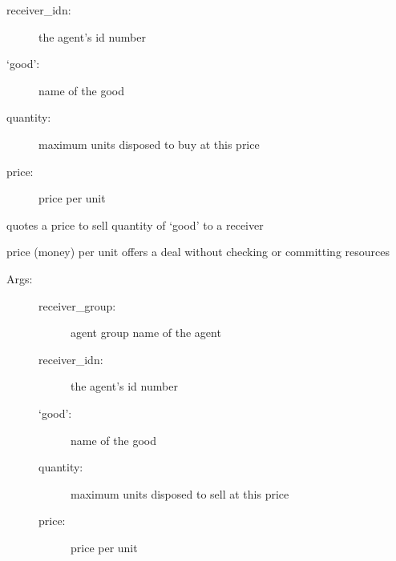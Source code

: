 \documentclass[letterpaper,10pt,english]{sphinxmanual}
\begin{document}
\begin{fulllineitems}
\begin{fulllineitems}
\begin{description}
\begin{description}
\item[{receiver\_idn:}] \leavevmode
the agent's id number

\item[{`good':}] \leavevmode
name of the good

\item[{quantity:}] \leavevmode
maximum units disposed to buy at this price

\item[{price:}] \leavevmode
price per unit

\end{description}

\end{description}

\end{fulllineitems}


\begin{fulllineitems}
\label{Trade:abce.Trade.quote_sell}
quotes a price to sell quantity of `good' to a receiver

price (money) per unit
offers a deal without checking or committing resources
\begin{description}
\item[{Args:}] \leavevmode\begin{description}
\item[{receiver\_group:}] \leavevmode
agent group name of the agent

\item[{receiver\_idn:}] \leavevmode
the agent's id number

\item[{`good':}] \leavevmode
name of the good

\item[{quantity:}] \leavevmode
maximum units disposed to sell at this price

\item[{price:}] \leavevmode
price per unit

\end{description}

\end{description}

\end{fulllineitems}



\end{fulllineitems}
\end{document}
